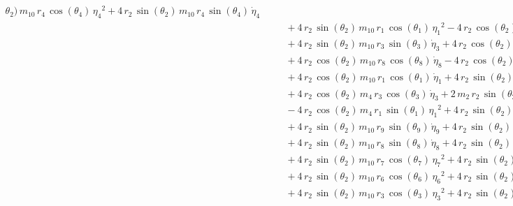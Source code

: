 \begin{eqnarray*}
{\theta_{2}})\,m_{10}\,r_{4}\,\cos({\theta_{4}})\,{{\eta_{4}}}^2 + 4\,r
_{2}\,\sin({\theta_{2}})\,m_{10}\,r_{4}\,\sin({\theta_{4}})\,{
\dot{\eta}_{4}} \\ &&\quad\mbox{} + 4\,r_{2}\,\sin({\theta_{2}})\,m_{
10}\,r_{1}\,\cos({\theta_{1}})\,{{\eta_{1}}}^2 - 4\,r_{2}\,\cos({
\theta_{2}})\,m_{10}\,r_{6}\,\sin({\theta_{6}})\,{{\eta_{6}}}^2
 \\ &&\quad\mbox{} + 4\,r_{2}\,\sin({\theta_{2}})\,m_{10}\,r_{3}\,\sin
({\theta_{3}})\,{\dot{\eta}_{3}} + 4\,r_{2}\,\cos({\theta_{2}})\,m_{10
}\,r_{6}\,\cos({\theta_{6}})\,{\dot{\eta}_{6}} \\ &&\quad\mbox{} + 4\,
r_{2}\,\cos({\theta_{2}})\,m_{10}\,r_{8}\,\cos({\theta_{8}})\,{
\dot{\eta}_{8}} - 4\,r_{2}\,\cos({\theta_{2}})\,m_{10}\,r_{7}\,\sin({
\theta_{7}})\,{{\eta_{7}}}^2 \\ &&\quad\mbox{} + 4\,r_{2}\,\cos({
\theta_{2}})\,m_{10}\,r_{1}\,\cos({\theta_{1}})\,{\dot{\eta}_{1}} + 4
\,r_{2}\,\sin({\theta_{2}})\,m_{3}\,r_{1}\,\cos({\theta_{1}})\,{{\eta
_{1}}}^2 \\ &&\quad\mbox{} + 4\,r_{2}\,\cos({\theta_{2}})\,m_{4}\,r_{3
}\,\cos({\theta_{3}})\,{\dot{\eta}_{3}} + 2\,m_{2}\,r_{2}\,\sin({
\theta_{2}})\,r_{1}\,\cos({\theta_{1}})\,{{\eta_{1}}}^2
 \\ &&\quad\mbox{} - 4\,r_{2}\,\cos({\theta_{2}})\,m_{4}\,r_{1}\,\sin(
{\theta_{1}})\,{{\eta_{1}}}^2 + 4\,r_{2}\,\sin({\theta_{2}})\,m_{10}\,
r_{9}\,\cos({\theta_{9}})\,{{\eta_{9}}}^2 \\ &&\quad\mbox{} + 4\,r_{2}
\,\sin({\theta_{2}})\,m_{10}\,r_{9}\,\sin({\theta_{9}})\,{\dot{\eta}_{
9}} + 4\,r_{2}\,\sin({\theta_{2}})\,m_{10}\,r_{8}\,\cos({\theta_{8}})
\,{{\eta_{8}}}^2 \\ &&\quad\mbox{} + 4\,r_{2}\,\sin({\theta_{2}})\,m_{
10}\,r_{8}\,\sin({\theta_{8}})\,{\dot{\eta}_{8}} + 4\,r_{2}\,\sin({
\theta_{2}})\,m_{10}\,r_{5}\,\sin({\theta_{5}})\,{\dot{\eta}_{5}}
 \\ &&\quad\mbox{} + 4\,r_{2}\,\sin({\theta_{2}})\,m_{10}\,r_{7}\,\cos
({\theta_{7}})\,{{\eta_{7}}}^2 + 4\,r_{2}\,\sin({\theta_{2}})\,m_{10}
\,r_{7}\,\sin({\theta_{7}})\,{\dot{\eta}_{7}} \\ &&\quad\mbox{} + 4\,r
_{2}\,\sin({\theta_{2}})\,m_{10}\,r_{6}\,\cos({\theta_{6}})\,{{\eta_{6
}}}^2 + 4\,r_{2}\,\sin({\theta_{2}})\,m_{10}\,r_{6}\,\sin({\theta_{6}}
)\,{\dot{\eta}_{6}} \\ &&\quad\mbox{} + 4\,r_{2}\,\sin({\theta_{2}})\,
m_{10}\,r_{3}\,\cos({\theta_{3}})\,{{\eta_{3}}}^2 + 4\,r_{2}\,\sin({
\theta_{2}})\,m_{4}\,r_{3}\,\sin({\theta_{3}})\,{\dot{\eta}_{3}}

\end{eqnarray*}
